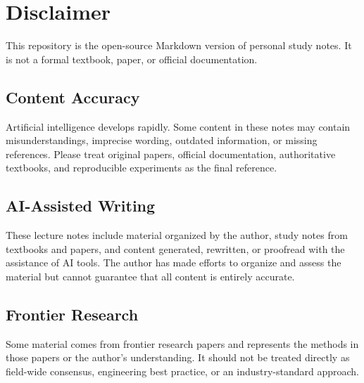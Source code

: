 \hypertarget{disclaimer}{%
\chapter{Disclaimer}\label{disclaimer}}

This repository is the open-source Markdown version of personal study notes. It is not a formal textbook, paper, or official documentation.

\hypertarget{content-accuracy}{%
\section{Content Accuracy}\label{content-accuracy}}

Artificial intelligence develops rapidly. Some content in these notes may contain misunderstandings, imprecise wording, outdated information, or missing references. Please treat original papers, official documentation, authoritative textbooks, and reproducible experiments as the final reference.

\hypertarget{ai-assisted-writing}{%
\section{AI-Assisted Writing}\label{ai-assisted-writing}}

These lecture notes include material organized by the author, study notes from textbooks and papers, and content generated, rewritten, or proofread with the assistance of AI tools. The author has made efforts to organize and assess the material but cannot guarantee that all content is entirely accurate.

\hypertarget{frontier-research}{%
\section{Frontier Research}\label{frontier-research}}

Some material comes from frontier research papers and represents the methods in those papers or the author's understanding. It should not be treated directly as field-wide consensus, engineering best practice, or an industry-standard approach.

\clearpage
